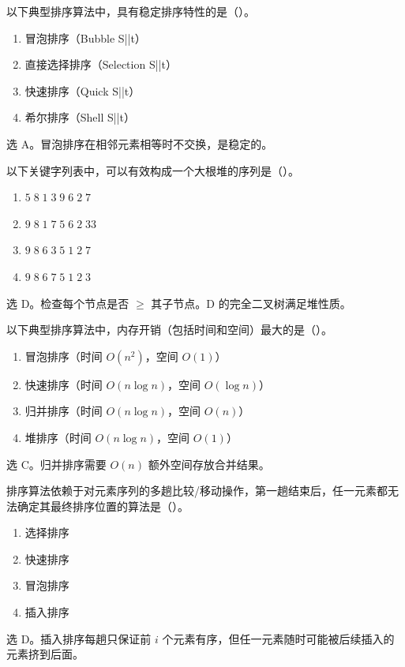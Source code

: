 \begin{question}
以下典型排序算法中，具有稳定排序特性的是（\quad）。
\begin{enumerate}
  \item 冒泡排序（Bubble S||t）
  \item 直接选择排序（Selection S||t）
  \item 快速排序（Quick S||t）
  \item 希尔排序（Shell S||t）
\end{enumerate}
\begin{solution}
选 A。冒泡排序在相邻元素相等时不交换，是稳定的。
\end{solution}
\end{question}

\begin{question}
以下关键字列表中，可以有效构成一个大根堆的序列是（\quad）。
\begin{enumerate}
  \item $5\;8\;1\;3\;9\;6\;2\;7$
  \item $9\;8\;1\;7\;5\;6\;2\;33$
  \item $9\;8\;6\;3\;5\;1\;2\;7$
  \item $9\;8\;6\;7\;5\;1\;2\;3$
\end{enumerate}
\begin{solution}
选 D。检查每个节点是否 $\ge$ 其子节点。D 的完全二叉树满足堆性质。
\end{solution}
\end{question}

\begin{question}
以下典型排序算法中，内存开销（包括时间和空间）最大的是（\quad）。
\begin{enumerate}
  \item 冒泡排序（时间 $O(n^2)$，空间 $O(1)$）
  \item 快速排序（时间 $O(n\log n)$，空间 $O(\log n)$）
  \item 归并排序（时间 $O(n\log n)$，空间 $O(n)$）
  \item 堆排序（时间 $O(n\log n)$，空间 $O(1)$）
\end{enumerate}
\begin{solution}
选 C。归并排序需要 $O(n)$ 额外空间存放合并结果。
\end{solution}
\end{question}

\begin{question}
排序算法依赖于对元素序列的多趟比较/移动操作，第一趟结束后，任一元素都无法确定其最终排序位置的算法是（\quad）。
\begin{enumerate}
  \item 选择排序
  \item 快速排序
  \item 冒泡排序
  \item 插入排序
\end{enumerate}
\begin{solution}
选 D。插入排序每趟只保证前 $i$ 个元素有序，但任一元素随时可能被后续插入的元素挤到后面。
\end{solution}
\end{question}

